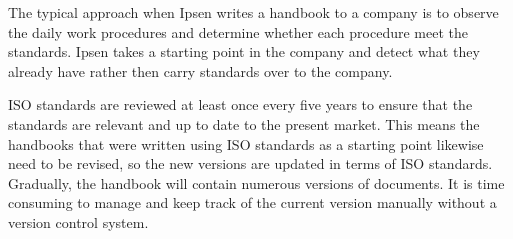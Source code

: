 The typical approach when Ipsen writes a handbook to a company is to observe the daily work procedures and determine whether each procedure meet the standards.
Ipsen takes a starting point in the company and detect what they already have rather then carry standards over to the company.


ISO standards are reviewed at least once every five years to ensure that the standards are relevant and up to date to the present market\cite{ISOreviewedevery5years}.
This means the handbooks that were written using ISO standards as a starting point likewise need to be revised, so the new versions are updated in terms of ISO standards.
Gradually, the handbook will contain numerous versions of documents.
It is time consuming to manage and keep track of the current version manually without a version control system.

